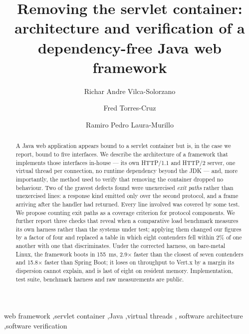 \documentclass[preprint,12pt]{elsarticle}
\begin{document}
\begin{frontmatter}

\title{Removing the servlet container: architecture and verification of a
       dependency-free Java web framework}

\author[una]{Richar Andre Vilca-Solorzano}

\author[una]{Fred Torres-Cruz}

\author[una]{Ramiro Pedro Laura-Murillo}


\begin{abstract}
A Java web application appears bound to a servlet container but is, in the case
we report, bound to five interfaces. We describe the architecture of a framework
that implements those interfaces in-house --- its own HTTP/1.1 and HTTP/2 server,
one virtual thread per connection, no runtime dependency beyond the JDK --- and,
more importantly, the method used to verify that removing the container dropped
no behaviour. Two of the gravest defects found were unexercised \emph{exit
paths} rather than unexercised lines: a response kind emitted only over the
second protocol, and a frame arriving after the handler had returned. Every line
involved was covered by some test. We propose counting exit paths as a coverage
criterion for protocol components. We further report three checks that reveal
when a comparative load benchmark measures its own harness rather than the
systems under test; applying them changed our figures by a factor of four and
replaced a table in which eight contenders fell within 2\% of one another with
one that discriminates. Under the corrected harness, on bare-metal Linux, the
framework boots in 155~ms, 2.9$\times$ faster than the closest of seven
contenders and 15.8$\times$ faster than Spring Boot; it loses on throughput to
Vert.x by a margin its dispersion cannot explain, and is last of eight on
resident memory. Implementation, test suite, benchmark harness and raw
measurements are public.
\end{abstract}

\begin{keyword}
web framework \sep servlet container \sep Java \sep virtual threads \sep
software architecture \sep software verification
\end{keyword}

\end{frontmatter}
\end{document}

